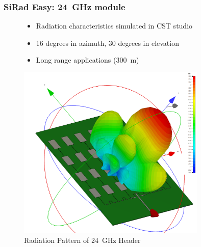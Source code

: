 \documentclass[aspectratio=169]{beamer}
\begin{document}
\begin{frame}[fragile]
  \frametitle{SiRad Easy: 24~GHz module}
  \begin{figure}[!htb]
    \begin{minipage}{0.48\textwidth}
      \begin{itemize}
        \item Radiation characteristics simulated in CST studio
        \item 16 degrees in azimuth, 30 degrees in elevation
        \item Long range applications (300~m)
      \end{itemize}
    \end{minipage}\hfill
    \begin{minipage}{0.48\textwidth}
      \centering
    \includegraphics[width=0.8\textwidth]{../img/farfield3d.png}
    \caption{Radiation Pattern of 24~GHz Header}
    \end{minipage}
  \end{figure}
\end{frame}
\end{document}
